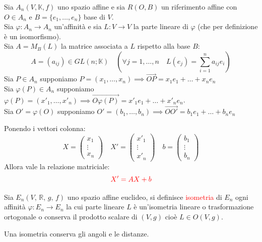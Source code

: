         \begin{richiamo}
        \mbox{} 
        
        Sia $A_n(V, \mathbb{K}, f)$ uno spazio affine e sia $R(O, B)$ un riferimento affine con $O \in A_n$ e $B = \{e_1, \dots, e_n\}$ base di $V$. \\
        Sia $\varphi: A_n \to A_n$ un'affinità e sia $L: V \to V$ la parte lineare di $\varphi$ (che per definizione è un isomorfismo). \\
        Sia $A = M_B(L)$ la matrice associata a $L$ rispetto alla base $B$:
        \[
        A = (a_{ij}) \in GL(n; \mathbb{K}) \quad \left( \forall j = 1, \dots, n \quad L(e_j) = \sum_{i=1}^n a_{ij} e_i \right)
        \]
        Sia $P \in A_n$ supponiamo $P = (x_1, \dots, x_n) \implies \overrightarrow{OP} = x_1 e_1 + \dots + x_n e_n$ \\
        Sia $\varphi(P) \in A_n$ supponiamo $\varphi(P) = (x'_1, \dots, x'_n) \implies \overrightarrow{O\varphi(P)} = x'_1 e_1 + \dots + x'_n e_n$.\\
        Sia $O' = \varphi(O)$ supponiamo $O' = (b_1, \dots, b_n) \implies \overrightarrow{OO'} = b_1 e_1 + \dots + b_n e_n$

        Ponendo i vettori colonna:
        \[
        X = \begin{pmatrix} x_1 \\ \vdots \\ x_n \end{pmatrix} \quad X' = \begin{pmatrix} x'_1 \\ \vdots \\ x'_n \end{pmatrix} \quad b = \begin{pmatrix} b_1 \\ \vdots \\ b_n \end{pmatrix}
        \]
        Allora vale la relazione matriciale:
        \[
        \color{red}{X' = AX + b}
        \]
        \end{richiamo}
        \begin{richiamo}
        Sia $E_n\left(V , \, \mathbb{R}, \, g, \, f \right)$ uno spazio affine euclideo, si definisce \textcolor{red}{isometria} di $E_n$ ogni affinità $\varphi: E_n \to E_n$ 
        la cui parte lineare $L$ è un'isometria lineare o trasformazione ortogonale o conserva il prodotto scalare di $\left(V,g\right)$ cioè $L \in O(V,g)$.

        Una isometria conserva gli angoli e le distanze.
        \end{richiamo}
